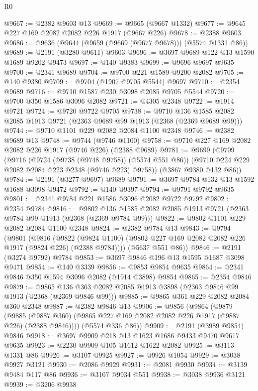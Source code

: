 \begin{lexlean}{R0}
\begin{coremodule}
@9667 := @2382 @9603 @13
@9669 := @9665 (@9667 @1332)
@9677 := @9645 @227 @169 @2082 @2082 @226 @1917 (@9667 @226)
@9678 := @2388 @9603
@9686 := @9636 (@9644 (@9659 (@9669 (@9677 @9678))) (@5574 @1331 @86))
@9689 := @2191 (@3280 @9611) @9603
@9696 := @3697 @9689 @122 @13 @1590 @1689 @9202 @9473
@9697 := @140 @9383
@9699 := @9696 @9697 @9635
@9700 := @2341 @9689
@9704 := @9700 @221 @1589 @9200 @2082
@9705 := @140 @9380
@9709 := @9704 (@1907 @9705 @5544) @9697
@9710 := @2354 @9689
@9716 := @9710 @1587 @230 @3098 @2085 @9705 @5544
@9720 := @9700 @350 @1586 @3096 @2082
@9721 := @4305 @2348
@9722 := @1914 @9721
@9724 := @9720 @9722 @9705
@9738 := @9710 @136 @1585 @2082 @2085 @1913 @9721 (@2363 @9689 @99 @1913 (@2368 (@2369 @9689 @99)))
@9744 := @9710 @1101 @229 @2082 @2084 @1100 @2348
@9746 := @2382 @9689 @13
@9748 := @9744 (@9746 @1100)
@9758 := @9710 @227 @169 @2082 @2082 @226 @1917 (@9746 @226) (@2388 @9689)
@9781 := @9699
    (@9709
      (@9716
        (@9724 (@9738 (@9748 @9758)) (@5574 @551 @86))
        (@9710 @224 @229 @2082 @2084 @223 @2348 (@9746 @223) @9758))
      (@3867 @9380 @132 @86))
@9784 := @2191 (@3277 @9697) @9689
@9791 := @3697 @9784 @132 @13 @1592 @1688 @3098 @9472
@9792 := @140 @9397
@9794 := @9791 @9792 @9635
@9801 := @2341 @9784 @221 @1586 @3096 @2082 @9722 @9792
@9802 := @2354 @9784
@9816 := @9802 @136 @1585 @2082 @2085 @1913 @9721 (@2363 @9784 @99 @1913 (@2368 (@2369 @9784 @99)))
@9822 := @9802 @1101 @229 @2082 @2084 @1100 @2348
@9824 := @2382 @9784 @13
@9843 := @9794
    (@9801
      (@9816
        (@9822 (@9824 @1100) (@9802 @227 @169 @2082 @2082 @226 @1917 (@9824 @226) (@2388 @9784))))
      (@5637 @551 @86))
@9846 := @2191 (@3274 @9792) @9784
@9853 := @3697 @9846 @196 @13 @1595 @1687 @3098 @9471
@9854 := @140 @3339
@9856 := @9853 @9854 @9635
@9864 := @2341 @9846 @350 @1594 @3096 @2082 (@1914 @3898) @9854
@9865 := @2354 @9846
@9879 := @9865 @136 @363 @2082 @2085 @1913 @3898 (@2363 @9846 @99 @1913 (@2368 (@2369 @9846 @99)))
@9885 := @9865 @361 @229 @2082 @2084 @360 @2348
@9887 := @2382 @9846 @13
@9906 := @9856
    (@9864
      (@9879
        (@9885 (@9887 @360) (@9865 @227 @169 @2082 @2082 @226 @1917 (@9887 @226) (@2388 @9846))))
      (@5574 @336 @86))
@9909 := @2191 (@3989 @9854) @9846
@9918 := @3697 @9909 @218 @13 @1623 @1686 @9433 @9470 @9617 @9635
@9923 := @2230 @9909 @105 @1612 @1622 @2082
@9925 := @3113 @1331 @86
@9926 := @3107 @9925
@9927 := @9926 @1054
@9929 := @3038 @9927 @3121
@9930 := @2086 @9929
@9931 := @2081 @9930
@9934 := @3139 @9484 @117 @86
@9936 := @3107 @9934 @551
@9938 := @3038 @9936 @3121
@9939 := @3206 @9938

\end{coremodule}
\end{lexlean}
